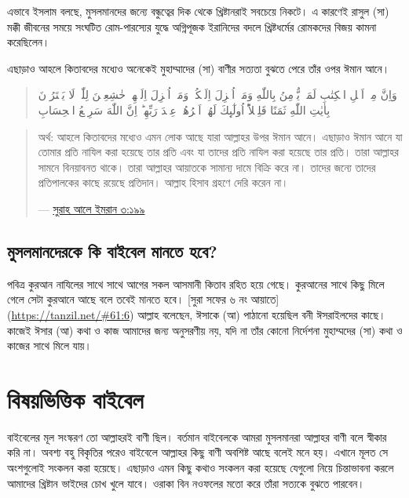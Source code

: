 \documentclass[
]{book}
\begin{document}
এভাবে ইসলাম বলছে, মুসলমানদের জন্যে বন্ধুত্বের দিক থেকে খ্রিষ্টানরাই সবচেয়ে নিকটে। এ কারণেই রাসুল (সা) মক্কী জীবনের সময়ে সংঘটিত রোম-পারস্যের যুদ্ধে অগ্নিপূজক ইরানিদের বদলে খ্রিষ্টধর্মের রোমকদের বিজয় কামনা করেছিলেন।

এছাড়াও আহলে কিতাবদের মধ্যেও অনেকেই মুহাম্মাদের (সা) বাণীর সত্যতা বুঝতে পেরে তাঁর ওপর ঈমান আনে।

\begin{quote}
وَاِنَّ مِنۡ اَهۡلِ الۡكِتٰبِ لَمَنۡ يُّؤۡمِنُ بِاللّٰهِ وَمَاۤ اُنۡزِلَ اِلَيۡكُمۡ وَمَاۤ اُنۡزِلَ اِلَيۡهِمۡ خٰشِعِيۡنَ لِلّٰهِۙ لَا يَشۡتَرُوۡنَ بِاٰيٰتِ اللّٰهِ ثَمَنًا قَلِيۡلاً‌ؕ اُولٰٓٮِٕكَ لَهُمۡ اَجۡرُهُمۡ عِنۡدَ رَبِّهِمۡ‌ؕ اِنَّ اللّٰهَ سَرِيۡعُ الۡحِسَابِ
\end{quote}

\begin{quote}
অর্থ: আহলে কিতাবদের মধ্যেও এমন লোক আছে যারা আল্লাহর উপর ঈমান আনে। এছাড়াও ঈমান আনে যা তোমার প্রতি নাযিল করা হয়েছে তার প্রতি এবং যা তাদের প্রতি নাযিল করা হয়েছে তার প্রতি। তারা আল্লাহর সামনে বিনয়াবনত থাকে। তারা আল্লাহর আয়াতকে সামান্য দামে বিক্রি করে না। তাদের জন্যে তাদের প্রতিপালকের কাছে রয়েছে প্রতিদান। আল্লাহ হিসাব গ্রহণে দেরি করেন না।

--- \href{http://tafheembangla.com/index.php/quran?show=quran\&surah_no=3\&limitstart=198}{সুরাহ আলে ইমরান ৩:১৯৯}
\end{quote}

\hypertarget{following-bible}{%
\section*{মুসলমানদেরকে কি বাইবেল মানতে হবে?}\label{following-bible}}

পবিত্র কুরআন নাযিলের সাথে সাথে আগের সকল আসমানী কিতাব রহিত হয়ে গেছে। কুরআনের সাথে কিছু মিলে গেলে সেটা কুরআনে আছে বলে তবেই মানতে হবে। {[}সুরা সফের ৬ নং আয়াতে{]} (\url{https://tanzil.net/\#61:6}) আল্লাহ বলেছেন, ঈসাকে (আ) পাঠানো হয়েছিল বনী ঈসরাইলদের কাছে। কাজেই ঈসার (আ) কথা ও কাজ আমাদের জন্য অনুসরণীয় নয়, যদি না তাঁর কোনো নির্দেশনা মুহাম্মদের (সা) কথা ও কাজের সাথে মিলে যায়।

\hypertarget{bible-index}{%
\chapter*{বিষয়ভিত্তিক বাইবেল}\label{bible-index}}

বাইবেলের মূল সংস্করণ তো আল্লাহরই বাণী ছিল। বর্তমান বাইবেলকে আমরা মুসলমানরা আল্লাহর বাণী বলে স্বীকার করি না। অবশ্য বহু বিকৃতির পরেও বাইবেলে আল্লাহর কিছু বাণী অবশিষ্ট আছে বলেই মনে হয়। এখানে মূলত সে অংশগুলোই সংকলন করা হয়েছে। এছাড়াও এমন কিছু কথাও সংকলন করা হয়েছে যেগুলো নিয়ে চিন্তাভাবনা করলে আমাদের খ্রিষ্টান ভাইদের চোখ খুলে যাবে। ওরাকা বিন নওফলের মতো করে তাঁরা সত্যকে বুঝতে পারবেন।
\end{document}

